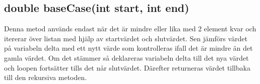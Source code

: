 \documentclass[a5paper,10pt,oneside]{article}
\begin{document}
\subsection{double baseCase(int start, int end)} 
Denna metod används endast när det är mindre eller lika med 2 element kvar  och itererar över listan med hjälp av startvärdet och slutvärdet. Sen jämförs värdet på variabeln delta med ett nytt värde som kontrolleras ifall det är mindre än det gamla värdet. Om det stämmer så deklareras variabeln delta till det nya värdet och loopen fortsätter tills det når slutvärdet.
Därefter returneras värdet tillbaka till den rekursiva metoden.
\end{document}

